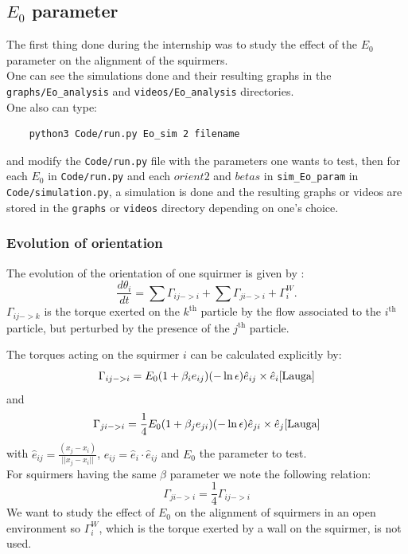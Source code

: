 \documentclass{article}
\begin{document}
\subsection{$E_0$ parameter}
The first thing done during the internship was to study the effect of the $E_0$ parameter on the alignment of the squirmers.\\
One can see the simulations done and their resulting graphs in the \texttt{graphs/Eo\_analysis} and \texttt{videos/Eo\_analysis} directories.\\
One also can type:
\begin{verbatim}
    python3 Code/run.py Eo_sim 2 filename
\end{verbatim}
and modify the \texttt{Code/run.py} file with the parameters one wants to test,
 then for each $E_0$ in \texttt{Code/run.py} and each $orient2$ and $betas$ in \texttt{sim\_Eo\_param} in \texttt{Code/simulation.py}, 
 a simulation is done and the resulting graphs or videos are stored in the \texttt{graphs} or \texttt{videos} 
 directory depending on one's choice.\\

\subsubsection{Evolution of orientation}
The evolution of the orientation of one squirmer is given by : 
$$
\frac{d \theta_i}{dt} = \sum \Gamma_{ij->i} + \sum \Gamma_{ji->i} +  \Gamma_{i}^W.
$$
$\Gamma_{ij->k}$ is the torque exerted on the $k^\mathrm{th}$ particle by the flow associated to the $i^\mathrm{th}$ particle, but perturbed by the presence of the $j^\mathrm{th}$ particle.\\

\vspace{0.5cm}

The torques acting on the squirmer $i$ can be calculated explicitly by: \\
$$
\Gamma_{ij->i} = E_0(1 + \beta_i e_{ij})(-\ln\epsilon)\hat{e}_{ij}\times \hat{e}_i \cite{Lauga}
$$
and
$$
\Gamma_{ji->i} = \frac{1}{4}E_0(1 + \beta_j e_{ji})(-\ln\epsilon)\hat{e}_{ji}\times \hat{e}_j \cite{Lauga}
$$
with $\hat{e}_{ij} = \frac{(x_j - x_i)}{||x_j - x_i||}$, $e_{ij} = \hat{e}_i\cdot \hat{e}_{ij}$ and $E_0$ the parameter to test.\\ 
For squirmers having the same $\beta$ parameter we note the following relation:
$$
\Gamma_{ji->i} = \frac{1}{4}\Gamma_{ij->i}
$$
We want to study the effect of $E_0$ on the alignment of squirmers in an open environment so $\Gamma_{i}^W$, which is the torque 
exerted by a wall on the squirmer, is not used.
\end{document}
